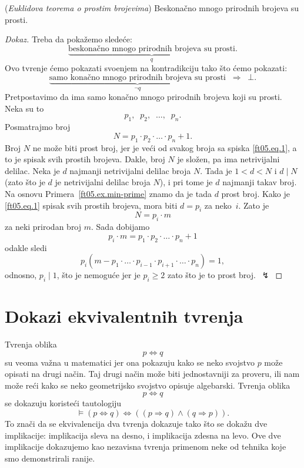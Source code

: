 \begin{EX} (\emph{Euklidova teorema o prostim brojevima})
  Beskona\v cno mnogo prirodnih brojeva su prosti.
\end{EX}
\begin{proof}[Dokaz]
  Treba da poka\v zemo slede\'ce:
  $$
    \underbrace{\text{beskona\v cno mnogo prirodnih brojeva su prosti}}_q.
  $$
  Ovo tvr\dj enje \'cemo pokazati svo\dj enjem na kontradikciju tako \v sto \'cemo pokazati:
  $$
    \underbrace{\text{samo kona\v cno mnogo prirodnih brojeva su prosti}}_{\lnot q}
    \;\;\Rightarrow\;\; \bot.
  $$
  Pretpostavimo da ima samo kona\v cno mnogo prirodnih brojeva koji su prosti. Neka su to
  \begin{equation}\label{ft05.eq.1}
    p_1,\;\; p_2,\;\; \ldots,\;\; p_n.
  \end{equation}
  Posmatrajmo broj
  $$
    N = p_1 \cdot p_2 \cdot \ldots \cdot p_n + 1.
  $$
  Broj $N$ ne mo\v ze biti prost broj, jer je ve\'ci od svakog broja sa spiska \eqref{ft05.eq.1}, a to je spisak svih prostih brojeva.
  Dakle, broj $N$ je slo\v zen, pa ima netrivijalni delilac. Neka je $d$ najmanji netrivijalni delilac broja $N$.
  Tada je $1 < d < N$ i $d \mid N$ (zato \v sto je $d$ je netrivijalni delilac broja $N$), i pri tome je $d$ najmanji takav broj.
  Na osnovu Primera~\ref{ft05.ex.min-prime} znamo da je tada $d$ prost broj. Kako je \eqref{ft05.eq.1} spisak svih
  prostih brojeva, mora biti $d = p_i$ za neko~$i$. Zato je
  $$
    N = p_i \cdot m
  $$
  za neki prirodan broj $m$. Sada dobijamo
  $$
    p_i \cdot m = p_1 \cdot p_2 \cdot \ldots \cdot p_n + 1
  $$
  odakle sledi
  $$
    p_i (m - p_1 \cdot \ldots \cdot p_{i-1} \cdot p_{i+1} \cdot \ldots \cdot p_n) = 1,
  $$
  odnosno, $p_i \mid 1$, \v sto je nemogu\'ce jer je $p_i \ge 2$ zato \v sto je to prost broj.~$\lightning$
\end{proof}

\clearpage

\section[Dokazi ekvivalentnih tvr\Dj enja]{Dokazi ekvivalentnih tvr\dj enja}

Tvr\dj enja oblika
$$
  p \Leftrightarrow q
$$
su veoma va\v zna u matematici jer ona pokazuju kako se neko svojstvo $p$ mo\v ze opisati na drugi
na\v cin. Taj drugi na\v cin mo\v ze biti jednostavniji za proveru, ili nam mo\v ze re\'ci kako se neko
geometrijsko svojstvo opisuje algebarski. Tvr\dj enja oblika
$$
  p \Leftrightarrow q
$$
se dokazuju koriste\'ci tautologiju
$$
  \vDash (p \Leftrightarrow q) \Leftrightarrow ((p \Rightarrow q) \land (q \Rightarrow p)).
$$
To zna\v ci da se ekvivalencija dva tvr\dj enja dokazuje tako \v sto se doka\v zu dve implikacije: implikacija
sleva na desno, i implikacija zdesna na levo. Ove dve implikacije dokazujemo kao nezavisna tvr\dj enja primenom
neke od tehnika koje smo demonstrirali ranije.

